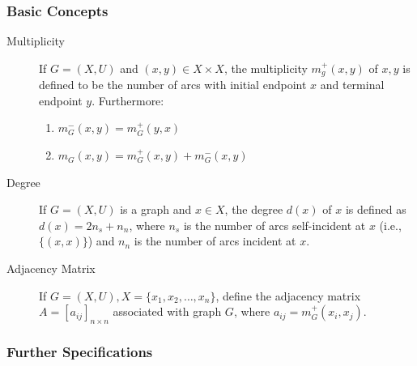 \documentclass[12pt]{report}
\begin{document}
\subsubsection{Basic Concepts \cite{berge1973}}
\begin{description}
	\item[Multiplicity] If $G=(X, U)$ and $(x, y) \in X\times X$, the multiplicity $m_g^+(x, y)$ of $x, y$ is defined to be the number of arcs with initial endpoint $x$ and terminal endpoint $y$. Furthermore:
	\begin{enumerate}
		\item $m_G^-(x, y) = m_G^+(y, x)$
		\item $m_G(x, y) = m_G^+(x, y) + m_G^-(x, y)$
	\end{enumerate}

	\item[Degree] If $G=(X, U)$ is a graph and $x\in X$, the degree $d(x)$ of $x$ is defined \cite{may1972} as
	$d(x) = 2n_s  + n_n$, where $n_s$ is the number of arcs self-incident at $x$ (i.e., $\{(x, x)\}$) and $n_n$ is the number of arcs incident at $x$.

	\item[Adjacency Matrix] If $G=(X, U), X=\{x_1, x_2, \dots, x_n \}$, define the adjacency matrix $A=[a_{ij}]_{n\times n}$ associated with graph $G$, where $a_{ij} = m_G^+(x_i, x_j)$.
\end{description}

\subsubsection{Further Specifications}
\end{document}
